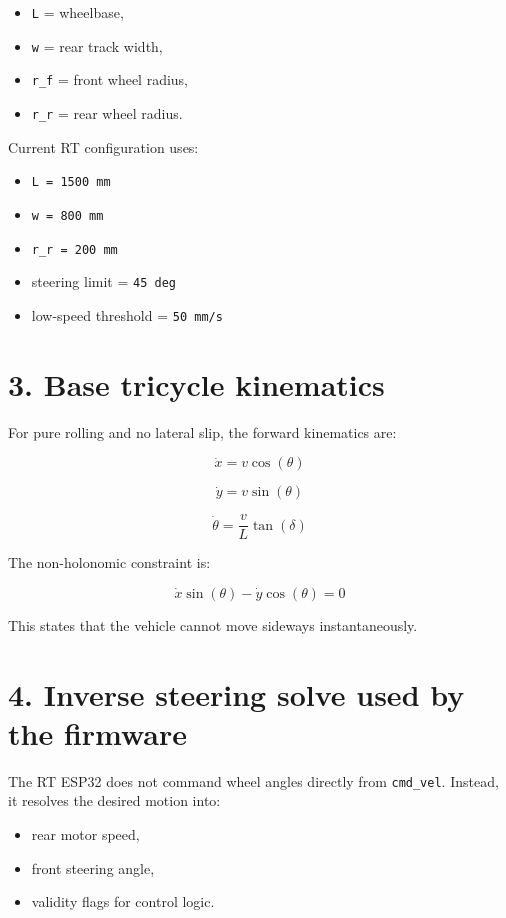 \documentclass[12pt,a4paper,oneside]{report}
\providecommand{\tightlist}{\setlength{\itemsep}{0pt}\setlength{\parskip}{0pt}}
\begin{document}
\begin{itemize}
\tightlist
\item
  \texttt{L} = wheelbase,
\item
  \texttt{w} = rear track width,
\item
  \texttt{r\_f} = front wheel radius,
\item
  \texttt{r\_r} = rear wheel radius.
\end{itemize}

Current RT configuration uses:

\begin{itemize}
\tightlist
\item
  \texttt{L\ =\ 1500\ mm}
\item
  \texttt{w\ =\ 800\ mm}
\item
  \texttt{r\_r\ =\ 200\ mm}
\item
  steering limit = \texttt{45\ deg}
\item
  low-speed threshold = \texttt{50\ mm/s}
\end{itemize}

\section{3. Base tricycle kinematics}\label{base-tricycle-kinematics}

For pure rolling and no lateral slip, the forward kinematics are:

\[
\dot{x} = v \cos(\theta)
\]

\[
\dot{y} = v \sin(\theta)
\]

\[
\dot{\theta} = \frac{v}{L} \tan(\delta)
\]

The non-holonomic constraint is:

\[
\dot{x} \sin(\theta) - \dot{y} \cos(\theta) = 0
\]

This states that the vehicle cannot move sideways instantaneously.

\section{4. Inverse steering solve used by the
firmware}\label{inverse-steering-solve-used-by-the-firmware}

The RT ESP32 does not command wheel angles directly from \texttt{cmd\_vel}.
Instead, it resolves the desired motion into:

\begin{itemize}
\tightlist
\item
  rear motor speed,
\item
  front steering angle,
\item
  validity flags for control logic.
\end{itemize}
\end{document}
